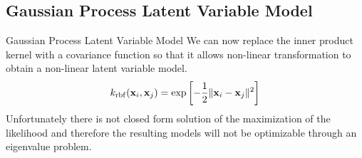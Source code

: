 \subsection{Gaussian Process Latent Variable Model}
\begin{frame}{Gaussian Process Latent Variable Model}
    We can now replace the inner product kernel with a covariance function so that it allows non-linear transformation to obtain a non-linear latent variable model.
    \begin{equation}
        k_{\mathrm{rbf}}(\mathbf{x}_i, \mathbf{x}_j) = \exp\left[ -\dfrac{1}{2} \| \mathbf{x}_i-\mathbf{x}_j \|^2 \right]
    \end{equation}
    \pause
    Unfortunately there is not closed form solution of the maximization of the likelihood and therefore the resulting models will not be optimizable through an eigenvalue problem.
\end{frame}
